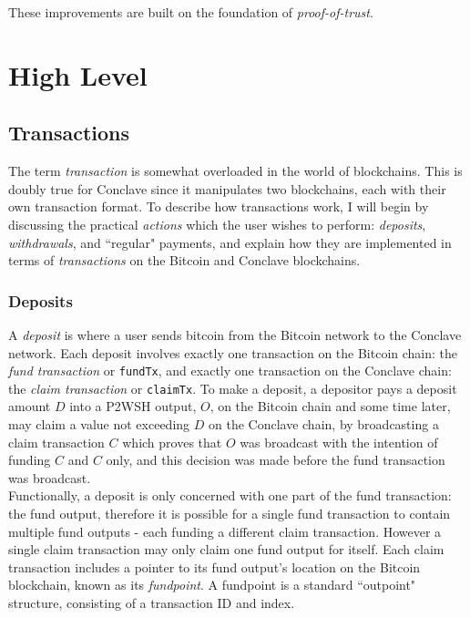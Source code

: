 \documentclass{report}
\begin{document}
		These improvements are built on the foundation of \textit{proof-of-trust}. 
		
	\section{High Level}
		

		\subsection{Transactions}
			The term \textit{transaction} is somewhat overloaded in the world of blockchains. This is doubly true for Conclave since it manipulates two blockchains, each with their own transaction format. To describe how transactions work, I will begin by discussing the practical \textit{actions} which the user wishes to perform: \textit{deposits}, \textit{withdrawals}, and ``regular" payments, and explain how they are implemented in terms of \textit{transactions} on the Bitcoin and Conclave blockchains.
			\subsubsection{Deposits} 
			A \textit{deposit} is where a user sends bitcoin from the Bitcoin network to the Conclave network. Each deposit involves exactly one transaction on the Bitcoin chain: the \textit{fund transaction} or \texttt{fundTx}, and exactly one transaction on the Conclave chain: the \textit{claim transaction} or \texttt{claimTx}. To make a deposit, a depositor pays a deposit amount $D$ into a P2WSH output, $O$, on the Bitcoin chain and some time later, may claim a value not exceeding $D$ on the Conclave chain, by broadcasting a claim transaction $C$ which proves that $O$ was broadcast with the intention of funding $C$ and $C$ only, and this decision was made before the fund transaction was broadcast. \\
			
			Functionally, a deposit is only concerned with one part of the fund transaction: the fund output, therefore it is possible for a single fund transaction to contain multiple fund outputs - each funding a different claim transaction. However a single claim transaction may only claim one fund output for itself. Each claim transaction includes a pointer to its fund output's location on the Bitcoin blockchain, known as its \textit{fundpoint}. A fundpoint is a standard ``outpoint" structure, consisting of a transaction ID and index. \\
			
\end{document}
